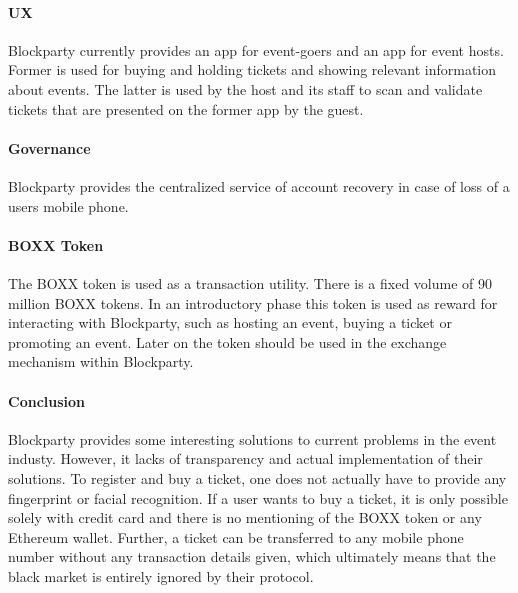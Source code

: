 \paragraph{UX} Blockparty currently provides an app for event-goers and an app for event hosts. Former is used for buying and holding tickets and showing relevant information about events. The latter is used by the host and its staff to scan and validate tickets that are presented on the former app by the guest.

\paragraph{Governance} Blockparty provides the centralized service of account recovery in case of loss of a users mobile phone.

\paragraph{BOXX Token} The BOXX token is used as a transaction utility. There is a fixed volume of 90 million BOXX tokens. In an introductory phase this token is used as reward for interacting with Blockparty, such as hosting an event, buying a ticket or promoting an event. Later on the token should be used in the exchange mechanism within Blockparty.

\paragraph{Conclusion} Blockparty provides some interesting solutions to current problems in the event industy. However, it lacks of transparency and actual implementation of their solutions. To register and buy a ticket, one does not actually have to provide any fingerprint or facial recognition. If a user wants to buy a ticket, it is only possible solely with credit card and there is no mentioning of the BOXX token or any Ethereum wallet. Further, a ticket can be transferred to any mobile phone number without any transaction details given, which ultimately means that the black market is entirely ignored by their protocol.

